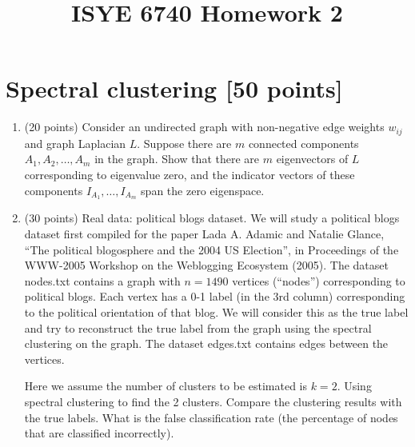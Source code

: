 \documentclass[twoside,10pt]{article}
\begin{document}
\title{ISYE 6740 Homework 2}
\date{}
\maketitle





\section{Spectral clustering [50 points]}

\begin{enumerate}
\item (20 points) Consider an undirected graph with non-negative edge weights $w_{ij}$ and graph Laplacian $L$. Suppose there are $m$ connected components $A_1, A_2, \ldots, A_m$ in the graph. Show that there are $m$ eigenvectors of $L$ corresponding to eigenvalue zero, and the indicator vectors of these components $I_{A_1}, \ldots, I_{A_m}$ span the zero eigenspace. 
\item (30 points) Real data: political blogs dataset.  We will study a political blogs dataset first compiled for the paper Lada A. Adamic and Natalie Glance, ``The political blogosphere and the 2004 US Election'', in Proceedings of the WWW-2005 Workshop on the Weblogging Ecosystem (2005). The dataset \textsf{nodes.txt} contains a graph with $n = 1490$ vertices (``nodes'') corresponding to political blogs. Each vertex has a 0-1 label (in the 3rd column) corresponding to the political orientation of that blog. We will consider this as the true label and try to reconstruct the true label from the graph using the spectral clustering on the graph. The dataset \textsf{edges.txt} contains edges between the vertices. 

Here we assume the number of clusters to be estimated is $k = 2$. Using spectral clustering to find the 2 clusters. Compare the clustering results with the true labels. What is the false classification rate (the percentage of nodes that are classified incorrectly).
\end{enumerate}
\end{document}
